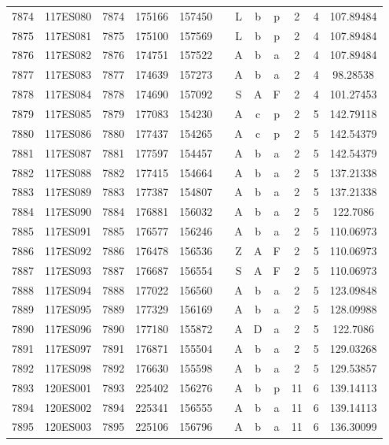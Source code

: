 \begin{tabular}{|*{12}{c|}}
7874 & 117ES080 & 7874 & 175166 & 157450 &  & L & b & p & 2 & 4 & 107.89484 \\ 
7875 & 117ES081 & 7875 & 175100 & 157569 &  & L & b & p & 2 & 4 & 107.89484 \\ 
7876 & 117ES082 & 7876 & 174751 & 157522 &  & A & b & a & 2 & 4 & 107.89484 \\ 
7877 & 117ES083 & 7877 & 174639 & 157273 &  & A & b & a & 2 & 4 & 98.28538 \\ 
7878 & 117ES084 & 7878 & 174690 & 157092 &  & S & A & F & 2 & 4 & 101.27453 \\ 
7879 & 117ES085 & 7879 & 177083 & 154230 &  & A & c & p & 2 & 5 & 142.79118 \\ 
7880 & 117ES086 & 7880 & 177437 & 154265 &  & A & c & p & 2 & 5 & 142.54379 \\ 
7881 & 117ES087 & 7881 & 177597 & 154457 &  & A & b & a & 2 & 5 & 142.54379 \\ 
7882 & 117ES088 & 7882 & 177415 & 154664 &  & A & b & a & 2 & 5 & 137.21338 \\ 
7883 & 117ES089 & 7883 & 177387 & 154807 &  & A & b & a & 2 & 5 & 137.21338 \\ 
7884 & 117ES090 & 7884 & 176881 & 156032 &  & A & b & a & 2 & 5 & 122.7086 \\ 
7885 & 117ES091 & 7885 & 176577 & 156246 &  & A & b & a & 2 & 5 & 110.06973 \\ 
7886 & 117ES092 & 7886 & 176478 & 156536 &  & Z & A & F & 2 & 5 & 110.06973 \\ 
7887 & 117ES093 & 7887 & 176687 & 156554 &  & S & A & F & 2 & 5 & 110.06973 \\ 
7888 & 117ES094 & 7888 & 177022 & 156560 &  & A & b & a & 2 & 5 & 123.09848 \\ 
7889 & 117ES095 & 7889 & 177329 & 156169 &  & A & b & a & 2 & 5 & 128.09988 \\ 
7890 & 117ES096 & 7890 & 177180 & 155872 &  & A & D & a & 2 & 5 & 122.7086 \\ 
7891 & 117ES097 & 7891 & 176871 & 155504 &  & A & b & a & 2 & 5 & 129.03268 \\ 
7892 & 117ES098 & 7892 & 176630 & 155598 &  & A & b & a & 2 & 5 & 129.53857 \\ 
7893 & 120ES001 & 7893 & 225402 & 156276 &  & A & b & p & 11 & 6 & 139.14113 \\ 
7894 & 120ES002 & 7894 & 225341 & 156555 &  & A & b & a & 11 & 6 & 139.14113 \\ 
7895 & 120ES003 & 7895 & 225106 & 156796 &  & A & b & a & 11 & 6 & 136.30099 \\ 

\end{tabular}
